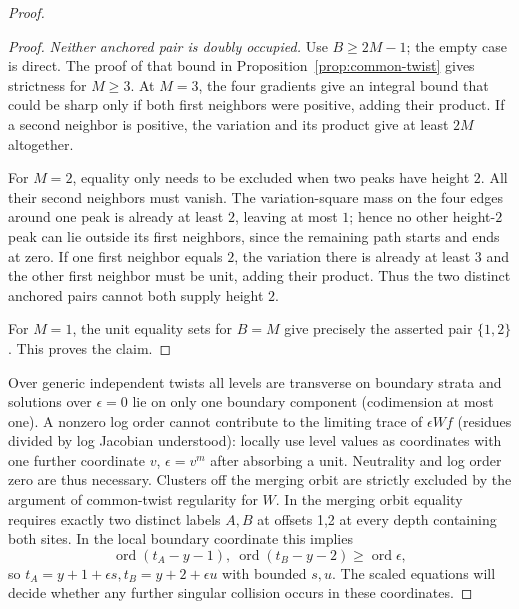 \begin{proof}
\begin{proof}
\emph{Neither anchored pair is doubly occupied.}
Use $B\ge2M-1$; the empty case is direct. The proof of that bound in Proposition~\ref{prop:common-twist} gives strictness for $M\ge3$. At $M=3$, the four gradients give an integral bound that could be sharp only if both first neighbors were positive, adding their product. If a second neighbor is positive, the variation and its product give at least $2M$ altogether.

For $M=2$, equality only needs to be excluded when two peaks have height $2$. All their second neighbors must vanish. The variation-square mass on the four edges around one peak is already at least $2$, leaving at most $1$; hence no other height-$2$ peak can lie outside its first neighbors, since the remaining path starts and ends at zero. If one first neighbor equals $2$, the variation there is already at least $3$ and the other first neighbor must be unit, adding their product. Thus the two distinct anchored pairs cannot both supply height $2$.

For $M=1$, the unit equality sets for $B=M$ give precisely the asserted pair $\{1,2\}$. This proves the claim.
\end{proof}

Over generic independent twists all levels are transverse on boundary strata and solutions over \(\epsilon=0\) lie on only one boundary component (codimension at most one). A nonzero log order cannot contribute to the limiting trace of \(\epsilon W f\) (residues divided by log Jacobian understood): locally use level values as coordinates with one further coordinate \(v\), \(\epsilon=v^m\) after absorbing a unit. Neutrality and log order zero are thus necessary. Clusters off the merging orbit are strictly excluded by the argument of common-twist regularity for \(W\). In the merging orbit equality requires exactly two distinct labels \(A,B\) at offsets 1,2 at every depth containing both sites. In the local boundary coordinate this implies
\[
 \operatorname{ord}(t_A-y-1),\ \operatorname{ord}(t_B-y-2)
 \ge \operatorname{ord}\epsilon,
\]
so \(t_A=y+1+\epsilon s,t_B=y+2+\epsilon u\) with bounded \(s,u\). The scaled equations will decide whether any further singular collision occurs in these coordinates.



\end{proof}

